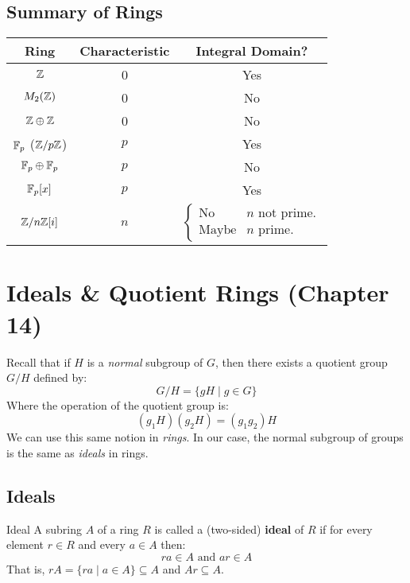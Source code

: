 \documentclass[letterpaper]{article}
\begin{document}
\subsection{Summary of Rings}
\begin{center}
    \begin{tabular}{c|c|c}
        \textbf{Ring}   & \textbf{Characteristic} & \textbf{Integral Domain?} \\ 
        \hline 
        $\mathbb{Z}$            & 0                       & Yes \\ 
        $M_{2}(\mathbb{Z})$     & 0                       & No \\ 
        $\mathbb{Z} \oplus \mathbb{Z}$  & 0                       & No \\ 
        $\mathbb{F}_p$ ($\mathbb{Z} / p\mathbb{Z}$) & $p$                 & Yes \\ 
        $\mathbb{F}_p \oplus \mathbb{F}_p$ & $p$                  & No \\ 
        $\mathbb{F}_{p}[x]$     & $p$                     & Yes \\ 
        $\mathbb{Z} / n\mathbb{Z}[i]$   & $n$                     & $\begin{cases}
            \text{No} & n \text{ not prime.} \\ 
            \text{Maybe} & n \text{ prime.}
        \end{cases}$
    \end{tabular}
\end{center}











\newpage 
\section{Ideals \& Quotient Rings (Chapter 14)}
Recall that if $H$ is a \emph{normal} subgroup of $G$, then there exists a quotient group $G / H$ defined by: 
\[G / H = \{gH \mid g \in G\}\]
Where the operation of the quotient group is: 
\[(g_1 H)(g_2 H) = (g_1 g_2) H\]
We can use this same notion in \emph{rings}. In our case, the normal subgroup of groups is the same as \emph{ideals} in rings. 

\subsection{Ideals}

\begin{definition}{Ideal}{}
    A subring $A$ of a ring $R$ is called a (two-sided) \textbf{ideal} of $R$ if for every element $r \in R$ and every $a \in A$ then: 
    \[ra \in A \text{ and } ar \in A\]
    That is, $rA = \{ra \mid a \in A\} \subseteq A$ and $Ar \subseteq A$. 
\end{definition}
\end{document}
